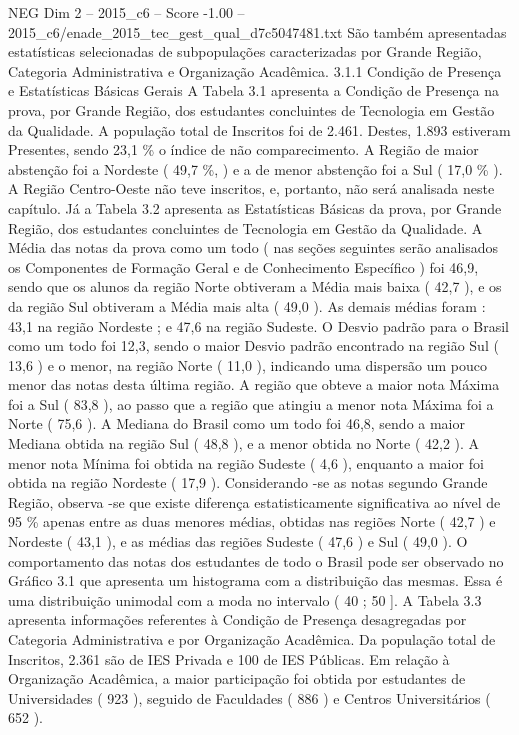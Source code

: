 \begin{textsample}{NEG Dim 2 – 2015\_c6 – Score -1.00 – 2015\_c6/enade\_2015\_tec\_gest\_qual\_d7c5047481.txt}
São também apresentadas estatísticas selecionadas de subpopulações caracterizadas por Grande Região, Categoria Administrativa e Organização Acadêmica. 3.1.1 Condição de Presença e Estatísticas Básicas Gerais A Tabela 3.1 apresenta a Condição de Presença na prova, por Grande Região, dos estudantes concluintes de Tecnologia em Gestão da Qualidade.
A população total de Inscritos foi de 2.461.
Destes, 1.893 estiveram Presentes, sendo 23,1 \% o índice de não comparecimento.
A Região de maior abstenção foi a Nordeste ( 49,7 \%, ) e a de menor abstenção foi a Sul ( 17,0 \% ).
A Região Centro-Oeste não teve inscritos, e, portanto, não será analisada neste capítulo.
Já a Tabela 3.2 apresenta as Estatísticas Básicas da prova, por Grande Região, dos estudantes concluintes de Tecnologia em Gestão da Qualidade.
A Média das notas da prova como um todo ( nas seções seguintes serão analisados os Componentes de Formação Geral e de Conhecimento Específico ) foi 46,9, sendo que os alunos da região Norte obtiveram a Média mais baixa ( 42,7 ), e os da região Sul obtiveram a Média mais alta ( 49,0 ).
As demais médias foram : 43,1 na região Nordeste ; e 47,6 na região Sudeste.
O Desvio padrão para o Brasil como um todo foi 12,3, sendo o maior Desvio padrão encontrado na região Sul ( 13,6 ) e o menor, na região Norte ( 11,0 ), indicando uma dispersão um pouco menor das notas desta última região.
A região que obteve a maior nota Máxima foi a Sul ( 83,8 ), ao passo que a região que atingiu a menor nota Máxima foi a Norte ( 75,6 ).
A Mediana do Brasil como um todo foi 46,8, sendo a maior Mediana obtida na região Sul ( 48,8 ), e a menor obtida no Norte ( 42,2 ).
A menor nota Mínima foi obtida na região Sudeste ( 4,6 ), enquanto a maior foi obtida na região Nordeste ( 17,9 ).
Considerando -se as notas segundo Grande Região, observa -se que existe diferença estatisticamente significativa ao nível de 95 \% apenas entre as duas menores médias, obtidas nas regiões Norte ( 42,7 ) e Nordeste ( 43,1 ), e as médias das regiões Sudeste ( 47,6 ) e Sul ( 49,0 ).
O comportamento das notas dos estudantes de todo o Brasil pode ser observado no Gráfico 3.1 que apresenta um histograma com a distribuição das mesmas.
Essa é uma distribuição unimodal com a moda no intervalo ( 40 ; 50 ].
A Tabela 3.3 apresenta informações referentes à Condição de Presença desagregadas por Categoria Administrativa e por Organização Acadêmica.
Da população total de Inscritos, 2.361 são de IES Privada e 100 de IES Públicas.
Em relação à Organização Acadêmica, a maior participação foi obtida por estudantes de Universidades ( 923 ), seguido de Faculdades ( 886 ) e Centros Universitários ( 652 ).

\end{textsample}
